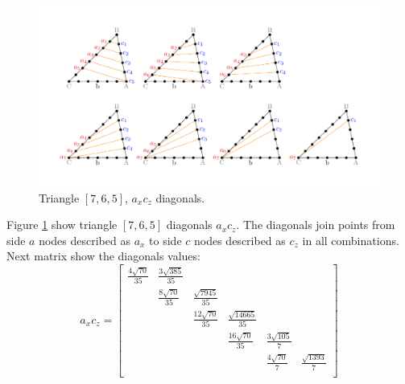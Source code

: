\documentclass[11pt]{article}
\begin{document}
\begin{figure}[htp]
\centering
\includegraphics[scale=1]{t765ac}
\caption{Triangle $[7,6,5]$, $a_xc_z$ diagonals.}
\label{t765ac}
\end{figure}

Figure \ref{t765ac} show triangle $[7,6,5]$ diagonals $a_xc_z$.
The diagonals join points from side $a$ nodes described as $a_x$ to side $c$ nodes described as $c_z$ in all combinations.
Next matrix show the diagonals values:
\[
a_xc_z = \begin{bmatrix}
	\frac{4\sqrt{70}}{35} & \frac{3\sqrt{385}}{35} \\
	& \frac{8\sqrt{70}}{35} & \frac{\sqrt{7945}}{35} \\
	& & \frac{12\sqrt{70}}{35} & \frac{\sqrt{14665}}{35} \\
	& & & \frac{16\sqrt{70}}{35} & \frac{3\sqrt{105}}{7} \\
	& & & & \frac{4\sqrt{70}}{7} & \frac{\sqrt{1393}}{7} \\
\end{bmatrix}
\]
\end{document}
